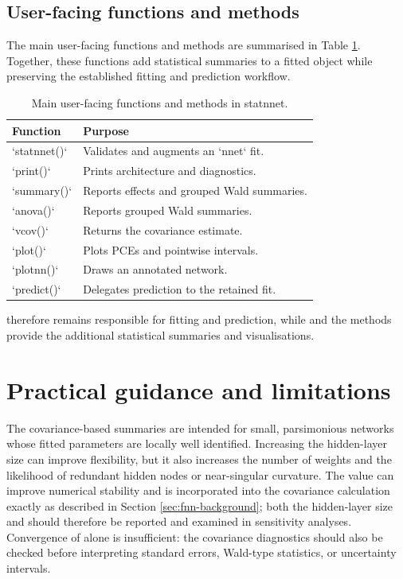 \subsection{User-facing functions and methods}\label{user-facing-functions-and-methods}

The main user-facing functions and methods are summarised in Table \ref{tab:statnnet-methods-table}.
Together, these functions add statistical summaries to a fitted  object while preserving the established fitting and prediction workflow.

\begin{table}

\caption{\label{tab:statnnet-methods-table}Main user-facing functions and methods in statnnet.}
\centering
\begin{tabular}[t]{l|l}
\hline
Function & Purpose\\
\hline
`statnnet()` & Validates and augments an `nnet` fit.\\
\hline
`print()` & Prints architecture and diagnostics.\\
\hline
`summary()` & Reports effects and grouped Wald summaries.\\
\hline
`anova()` & Reports grouped Wald summaries.\\
\hline
`vcov()` & Returns the covariance estimate.\\
\hline
`plot()` & Plots PCEs and pointwise intervals.\\
\hline
`plotnn()` & Draws an annotated network.\\
\hline
`predict()` & Delegates prediction to the retained fit.\\
\hline
\end{tabular}
\end{table}

 therefore remains responsible for fitting and prediction, while  and the  methods provide the additional statistical summaries and visualisations.

\section{Practical guidance and limitations}\label{sec:limitations}

The covariance-based summaries are intended for small, parsimonious networks whose fitted parameters are locally well identified.
Increasing the hidden-layer size can improve flexibility, but it also increases the number of weights and the likelihood of redundant hidden nodes or near-singular curvature.
The  value can improve numerical stability and is incorporated into the covariance calculation exactly as described in Section \ref{sec:fnn-background}; both the hidden-layer size and  should therefore be reported and examined in sensitivity analyses.
Convergence of  alone is insufficient: the covariance diagnostics should also be checked before interpreting standard errors, Wald-type statistics, or uncertainty intervals.

